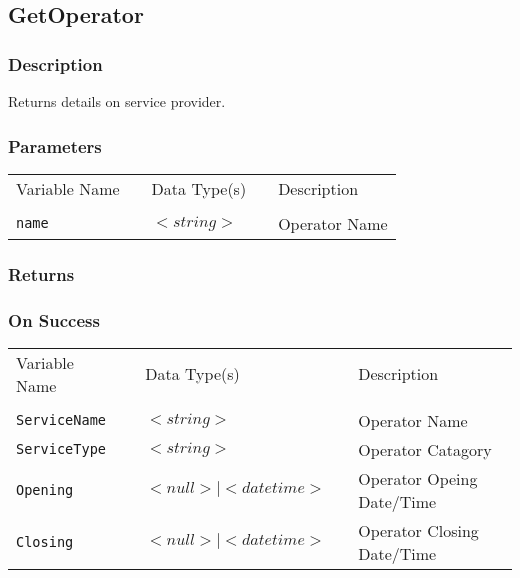 \subsection{GetOperator}

\subsubsection{Description}

Returns details on service provider.

\subsubsection{Parameters}

\begin{tabular}{lllll}
Variable Name	&		&	Data Type(s)		&	&	Description	\\
				&	&	&	&	\\
\verb!name! & \hspace{15mm} & $<string>$ & \hspace{15mm} & Operator Name \\
\end{tabular}

\subsubsection{Returns}

\subsubsection{On Success}

\begin{tabular}{lllll}
Variable Name	&		&	Data Type(s)		&	&	Description	\\
				&	&	&	&	\\
\verb!ServiceName! & \hspace{15mm} & $<string>$ & \hspace{15mm} & Operator Name \\
\verb!ServiceType! & \hspace{15mm} & $<string>$ & \hspace{15mm} & Operator Catagory \\
\verb!Opening! & \hspace{15mm} & $<null> \mid <datetime>$ & \hspace{15mm} & Operator Opeing Date/Time \\
\verb!Closing! & \hspace{15mm} & $<null> \mid <datetime>$ & \hspace{15mm} & Operator Closing Date/Time \\
\end{tabular}

